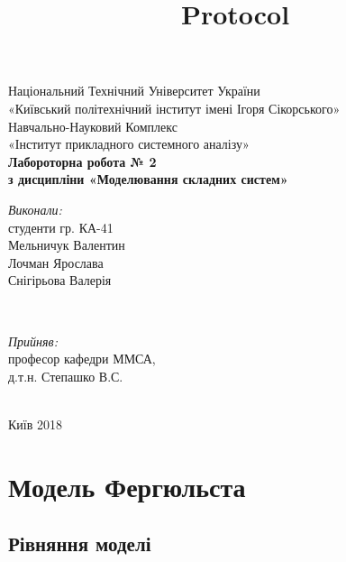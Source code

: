 \documentclass[11pt]{article}
\title{Protocol}
\begin{document}
    
    
    
\begin{titlepage} 

\center

{\large
Національний Технічний Університет України\\[0.2cm]
«Київський політехнічний інститут імені Ігоря Сікорського»\\[0.2cm]
Навчально-Науковий Комплекс \\[0.2cm]
«Інститут прикладного системного аналізу»
}\\[4cm] %


{ \LARGE \bfseries
Лабороторна робота № 2 \\[0.4cm]
з дисципліни «Моделювання складних систем»
}\\[5cm] %

\begin{minipage}{0.4\textwidth}
\begin{flushleft} \large
\emph{Виконали:} \\
студенти гр. КА-41 \\
Мельничук Валентин \\
Лочман Ярослава  \\
Снігірьова Валерія
\end{flushleft}
\end{minipage}
~
\begin{minipage}{0.4\textwidth}
\begin{flushright} \large
\emph{Прийняв:} \\
професор кафедри ММСА, \\
д.т.н. Степашко В.С. \\
\end{flushright}
\end{minipage}\\[6cm]

Київ 2018

\vfill %

\end{titlepage}

    \newpage
    \section{Модель
Фергюльста}\label{ux43cux43eux434ux435ux43bux44c-ux444ux435ux440ux433ux44eux43bux44cux441ux442ux430}

    \subsection{Рівняння
моделі}\label{ux440ux456ux432ux43dux44fux43dux43dux44f-ux43cux43eux434ux435ux43bux456}
\end{document}
